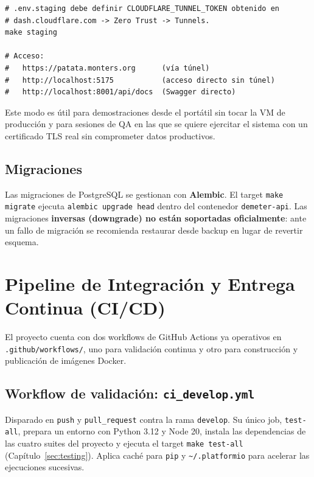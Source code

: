 \begin{lstlisting}[style=trama, caption={Variante staging con túnel Cloudflare}]
# .env.staging debe definir CLOUDFLARE_TUNNEL_TOKEN obtenido en
# dash.cloudflare.com -> Zero Trust -> Tunnels.
make staging

# Acceso:
#   https://patata.monters.org      (vía túnel)
#   http://localhost:5175           (acceso directo sin túnel)
#   http://localhost:8001/api/docs  (Swagger directo)
\end{lstlisting}

Este modo es útil para demostraciones desde el portátil sin tocar la VM de
producción y para sesiones de QA en las que se quiere ejercitar el sistema con un
certificado TLS real sin comprometer datos productivos.

\subsection{Migraciones}

Las migraciones de PostgreSQL se gestionan con \textbf{Alembic}. El target
\texttt{make migrate} ejecuta \texttt{alembic upgrade head} dentro del contenedor
\texttt{demeter-api}. Las migraciones \textbf{inversas (downgrade) no están soportadas
oficialmente}: ante un fallo de migración se recomienda restaurar desde backup en
lugar de revertir esquema.

\section{Pipeline de Integración y Entrega Continua (CI/CD)}
\label{sec:despliegue_cicd}

El proyecto cuenta con dos workflows de GitHub Actions ya operativos en
\texttt{.github/workflows/}, uno para validación continua y otro para construcción y
publicación de imágenes Docker.

\subsection{Workflow de validación: \texttt{ci\_develop.yml}}

Disparado en \texttt{push} y \texttt{pull\_request} contra la rama \texttt{develop}.
Su único job, \texttt{test-all}, prepara un entorno con Python 3.12 y Node 20,
instala las dependencias de las cuatro suites del proyecto y ejecuta el target
\texttt{make test-all} (Capítulo~\ref{sec:testing}). Aplica caché para \texttt{pip}
y \texttt{\textasciitilde/.platformio} para acelerar las ejecuciones sucesivas.

